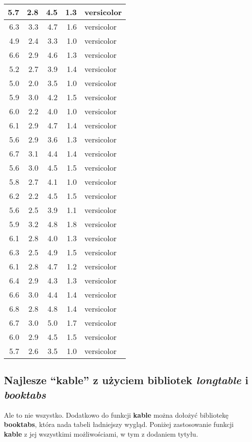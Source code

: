 \documentclass[a4paper, 10pt]{article}\usepackage[]{graphicx}\usepackage[]{color}
\begin{document}
\begin{longtable}{r|r|r|r|l}
\hline
5.7 & 2.8 & 4.5 & 1.3 & versicolor\\
\hline
6.3 & 3.3 & 4.7 & 1.6 & versicolor\\
\hline
4.9 & 2.4 & 3.3 & 1.0 & versicolor\\
\hline
6.6 & 2.9 & 4.6 & 1.3 & versicolor\\
\hline
5.2 & 2.7 & 3.9 & 1.4 & versicolor\\
\hline
5.0 & 2.0 & 3.5 & 1.0 & versicolor\\
\hline
5.9 & 3.0 & 4.2 & 1.5 & versicolor\\
\hline
6.0 & 2.2 & 4.0 & 1.0 & versicolor\\
\hline
6.1 & 2.9 & 4.7 & 1.4 & versicolor\\
\hline
5.6 & 2.9 & 3.6 & 1.3 & versicolor\\
\hline
6.7 & 3.1 & 4.4 & 1.4 & versicolor\\
\hline
5.6 & 3.0 & 4.5 & 1.5 & versicolor\\
\hline
5.8 & 2.7 & 4.1 & 1.0 & versicolor\\
\hline
6.2 & 2.2 & 4.5 & 1.5 & versicolor\\
\hline
5.6 & 2.5 & 3.9 & 1.1 & versicolor\\
\hline
5.9 & 3.2 & 4.8 & 1.8 & versicolor\\
\hline
6.1 & 2.8 & 4.0 & 1.3 & versicolor\\
\hline
6.3 & 2.5 & 4.9 & 1.5 & versicolor\\
\hline
6.1 & 2.8 & 4.7 & 1.2 & versicolor\\
\hline
6.4 & 2.9 & 4.3 & 1.3 & versicolor\\
\hline
6.6 & 3.0 & 4.4 & 1.4 & versicolor\\
\hline
6.8 & 2.8 & 4.8 & 1.4 & versicolor\\
\hline
6.7 & 3.0 & 5.0 & 1.7 & versicolor\\
\hline
6.0 & 2.9 & 4.5 & 1.5 & versicolor\\
\hline
5.7 & 2.6 & 3.5 & 1.0 & versicolor\\
\hline
\end{longtable}


\subsection{Najlesze ``kable'' z użyciem bibliotek \emph{longtable} i \emph{booktabs}}

Ale to nie wszystko. Dodatkowo do funkcji \textbf{kable} można dołożyć bibliotekę \textbf{booktabs}, która nada tabeli ładniejszy wygląd. Poniżej zastosowanie funkcji \textbf{kable} z jej wszystkimi możliwościami, w tym z dodaniem tytyłu.
\end{document}
